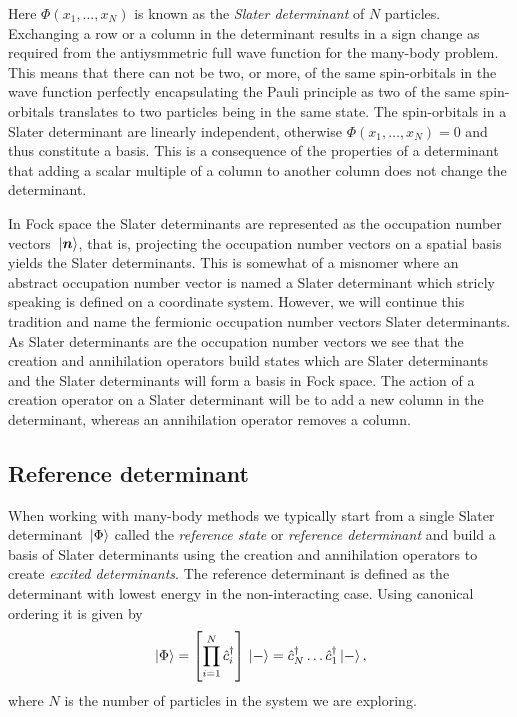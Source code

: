         Here $\Phi(x_1, \dots, x_N)$ is known as the \emph{Slater determinant}
        of $N$ particles.
        Exchanging a row or a column in the determinant results in a sign change
        as required from the antiysmmetric full wave function for the many-body
        problem.
        This means that there can not be two, or more, of the same spin-orbitals
        in the wave function perfectly encapsulating the Pauli principle as two
        of the same spin-orbitals translates to two particles being in the same
        state.
        The spin-orbitals in a Slater determinant are linearly independent,
        otherwise $\Phi(x_1, \dots, x_N) = 0$ and thus constitute a basis.
        This is a consequence of the properties of a determinant that adding a
        scalar multiple of a column to another column does not change the
        determinant.

        In Fock space the Slater determinants are represented as the occupation
        number vectors $\ket*{\boldsymbol{n}}$, that is, projecting the occupation
        number vectors on a spatial basis yields the Slater determinants.
        This is somewhat of a misnomer where an abstract occupation number
        vector is named a Slater determinant which stricly speaking is defined
        on a coordinate system.
        However, we will continue this tradition and name the fermionic
        occupation number vectors Slater determinants.
        As Slater determinants are the occupation number vectors we see that the
        creation and annihilation operators build states which are Slater
        determinants and the Slater determinants will form a basis in Fock
        space.
        The action of a creation operator on a Slater determinant will be to add
        a new column in the determinant, whereas an annihilation operator
        removes a column.

        \subsection{Reference determinant}
            When working with many-body methods we typically start from a single
            Slater determinant $\ket*{\Phi}$ called the \emph{reference state}
            or \emph{reference determinant} and build a basis of Slater
            determinants using the creation and annihilation operators to create
            \emph{excited determinants}.
            The reference determinant is defined as the determinant with lowest
            energy in the non-interacting case.
            Using canonical ordering it is given by
            \begin{align}
                \ket*{\Phi}
                = \left[ 
                    \prod_{i = 1}^{N} \hat{c}_{i}^{\dagger}
                 \right] \ket*{-}
                = \hat{c}_{N}^{\dagger}\dots\hat{c}_{1}^{\dagger}\ket*{-},
            \end{align}
            where $N$ is the number of particles in the system we are exploring.

